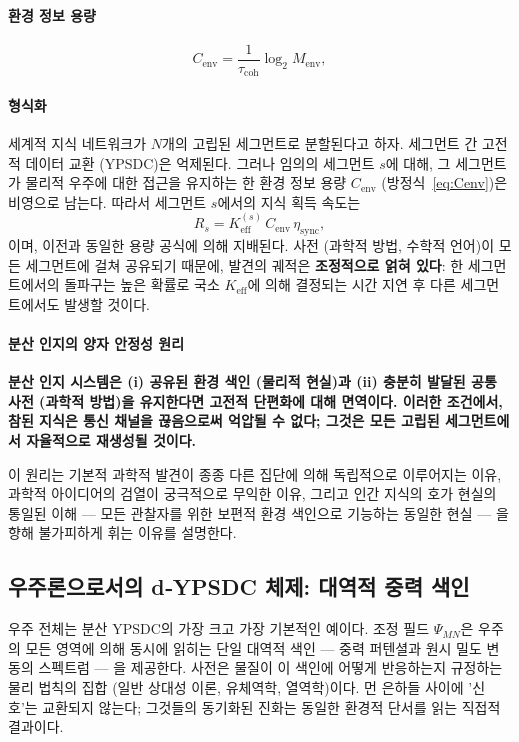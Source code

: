 \documentclass[11pt,a4paper]{article}
\begin{document}
\paragraph{환경 정보 용량}
\[
C_{\mathrm{env}} = \frac{1}{\tau_{\mathrm{coh}}} \log_2 M_{\mathrm{env}},
\label{eq:Cenv}
\]

\paragraph*{형식화}
세계적 지식 네트워크가 $N$개의 고립된 세그먼트로 분할된다고 하자. 세그먼트 간 고전적 데이터 교환 (YPSDC)은 억제된다. 그러나 임의의 세그먼트 $s$에 대해, 그 세그먼트가 물리적 우주에 대한 접근을 유지하는 한 환경 정보 용량 $C_{\mathrm{env}}$ (방정식~\ref{eq:Cenv})은 비영으로 남는다. 따라서 세그먼트 $s$에서의 지식 획득 속도는
\[
R_s = K_{\mathrm{eff}}^{(s)} \, C_{\mathrm{env}} \, \eta_{\mathrm{sync}},
\]
이며, 이전과 동일한 용량 공식에 의해 지배된다. 사전 (과학적 방법, 수학적 언어)이 모든 세그먼트에 걸쳐 공유되기 때문에, 발견의 궤적은 \textbf{조정적으로 얽혀 있다}: 한 세그먼트에서의 돌파구는 높은 확률로 국소 $K_{\mathrm{eff}}$에 의해 결정되는 시간 지연 후 다른 세그먼트에서도 발생할 것이다.

\paragraph*{분산 인지의 양자 안정성 원리}
\textbf{분산 인지 시스템은 (i) 공유된 환경 색인 (물리적 현실)과 (ii) 충분히 발달된 공통 사전 (과학적 방법)을 유지한다면 고전적 단편화에 대해 면역이다. 이러한 조건에서, 참된 지식은 통신 채널을 끊음으로써 억압될 수 없다; 그것은 모든 고립된 세그먼트에서 자율적으로 재생성될 것이다.}

이 원리는 기본적 과학적 발견이 종종 다른 집단에 의해 독립적으로 이루어지는 이유, 과학적 아이디어의 검열이 궁극적으로 무익한 이유, 그리고 인간 지식의 호가 현실의 통일된 이해 — 모든 관찰자를 위한 보편적 환경 색인으로 기능하는 동일한 현실 — 을 향해 불가피하게 휘는 이유를 설명한다.

\subsection{우주론으로서의 d‑YPSDC 체제: 대역적 중력 색인}
\label{subsec:cosmology-dypsdc}

우주 전체는 분산 YPSDC의 가장 크고 가장 기본적인 예이다. 조정 필드 $\Psi_{MN}$은 우주의 모든 영역에 의해 동시에 읽히는 단일 대역적 색인 — 중력 퍼텐셜과 원시 밀도 변동의 스펙트럼 — 을 제공한다. 사전은 물질이 이 색인에 어떻게 반응하는지 규정하는 물리 법칙의 집합 (일반 상대성 이론, 유체역학, 열역학)이다. 먼 은하들 사이에 '신호'는 교환되지 않는다; 그것들의 동기화된 진화는 동일한 환경적 단서를 읽는 직접적 결과이다.
\end{document}
